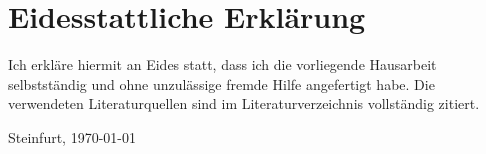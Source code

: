 \chapter*{Eidesstattliche Erklärung}

Ich erkläre hiermit an Eides statt, dass ich die vorliegende Hausarbeit selbstständig und ohne unzulässige fremde Hilfe angefertigt habe. Die verwendeten Literaturquellen sind im Literaturverzeichnis vollständig zitiert.





\vspace{6cm}
Steinfurt, \today
